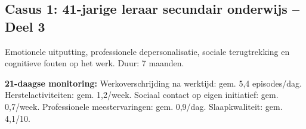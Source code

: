 \documentclass[11pt,a4paper]{article}
\begin{document}
\vspace{0.5em}

\newpage
\subsection*{Casus 1: 41-jarige leraar secundair onderwijs -- Deel 3}

\begin{complaintbox}[title={Casus 1: 41-jarige leraar secundair onderwijs}]
\small Emotionele uitputting, professionele depersonalisatie, sociale terugtrekking en cognitieve fouten op het werk. Duur: 7 maanden.
\end{complaintbox}

\begin{monitorbox}
\small\textbf{21-daagse monitoring:} Werkoverschrijding na werktijd: gem. 5,4 episodes/dag. Herstelactiviteiten: gem. 1,2/week. Sociaal contact op eigen initiatief: gem. 0,7/week. Professionele meestervaringen: gem. 0,9/dag. Slaapkwaliteit: gem. 4,1/10.
\end{monitorbox}
\end{document}
